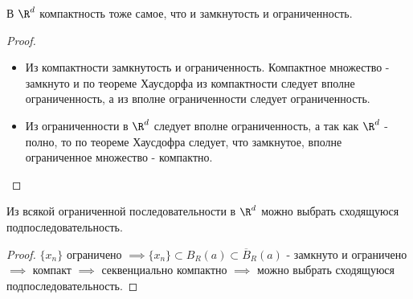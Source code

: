 \begin{theorem} \thmslashn

  В $\R^d$ компактность тоже самое, что и замкнутость и ограниченность.
  \begin{proof} \thmslashn

    \begin{itemize}
      \item Из компактности замкнутость и ограниченность. Компактное множество - замкнуто и по теореме Хаусдорфа из компактности следует вполне ограниченность, а из вполне ограниченности следует ограниченность.
      \item Из ограниченности в $\R^d$ следует вполне ограниченность, а так как $\R^d$ - полно, то по теореме Хаусдофра следует, что замкнутое, вполне ограниченное множество -  компактно. 
    \end{itemize}
  \end{proof}
\end{theorem}

\begin{theorem} \thmslashn

    Из всякой ограниченной последовательности в $\R^{d}$ можно выбрать сходящуюся подпоследовательность.
    \begin{proof} \thmslashn
    
        $\{x_{n}\}$ ограничено $\implies \{x_{n}\} \subset B_{R}(a) \subset \overline{B}_{R}(a) $ - замкнуто и ограничено $\implies$ компакт $\implies$ секвенциально компактно $\implies$ можно выбрать сходящуюся подпоследовательность.
    \end{proof}
\end{theorem}


